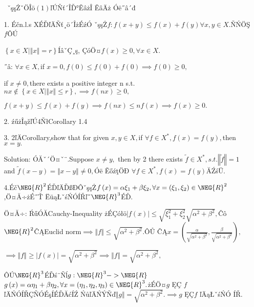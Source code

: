 \documentclass{article}
\begin{document}
\begin{CJK}{GBK}{song}


\bigskip\ 
ˇşşŻˇÖÎö$\left(
1\right) $ľÚŇť´ÎĎ°ĚâżÎ ĚâÄż%
Óë˝â´đ

1. Éčn.l.s XÉĎľÄŇť¸ö´ÎżÉźÓ%
ˇşşŻ$f:f(x+y)\leq f\left( x\right) +f\left( y\right) \forall
x,y\in X.$ŇŃÖŞ$f$ÔÚ

$\left\{ x\in X|\left\Vert x\right\Vert =r\right\} $ÍâˇÇ¸ş,%
ÇóÖ¤$f\left( x\right) \geq 0,\forall x\in X.$

˝â: $\forall x\in X,$if $x=0,f\left( 0\right) \leq f\left( 0\right)
+f\left( 0\right) \implies f\left( 0\right) \geq 0,$

if $x\neq 0,$there exists a positive integer n s.t. $nx\notin \left\{ x\in
X|\left\Vert x\right\Vert \leq r\right\} ,\implies f\left( nx\right) \geq 0,$

$f(x+y)\leq f\left( x\right) +f\left( y\right) \implies f\left( nx\right)
\leq nf\left( x\right) \implies f\left( x\right) \geq 0.$

2. źűżÎąžľÚ4ŇłCorollary 1.4

3. 2ľÄCorollary,show that for given $x,y\in X,$if $\forall f\in
X^{\ast },f\left( x\right) =f\left( y\right) ,$then $x=y.$

Solution: ÓĂˇ´Ö¤ˇ¨.Suppose $x\neq y,$ then by 2
there exists $\tilde{f}\in X^{\ast },s.t.\left\Vert \tilde{f}\right\Vert =1$
and $\tilde{f}\left( x-y\right) =\left\Vert x-y\right\Vert \neq 0,$Óë%
ĚőźţÖĐ $\forall f\in X^{\ast },f\left( x\right) =f\left(
y\right) $ĂŹśÜ.

4.Éč$\NEG{R}^{2}$ÉĎľÄĎßĐÔˇşşŻ$%
f\left( x\right) =\alpha \xi _{1}+\beta \xi _{2},\forall x=\left( \xi
_{1},\xi _{2}\right) \in \NEG{R}^{2}$,Ö¤Ă÷żÉ˝Ť%
ËüąŁˇśŃÓÍŘľ˝$\NEG{R}^{3}$ÉĎ.

Ö¤Ă÷: ŔűÓĂCauchy-Inequality żÉÇółö$%
\left\vert f\left( x\right) \right\vert \leq \sqrt{\xi _{1}^{2}+\xi _{2}^{2}}%
\sqrt{\alpha ^{2}+\beta ^{2}},$Čô$\NEG{R}^{2}$ČĄEuclid norm$%
\implies \left\Vert f\right\Vert \leq \sqrt{\alpha ^{2}+\beta ^{2}}.$ÔŮ%
ČĄ$x=\left( \frac{\alpha }{\sqrt{\alpha ^{2}+\beta ^{2}}},\frac{\beta 
}{\sqrt{\alpha ^{2}+\beta ^{2}}}\right) ,$

$\implies \left\Vert f\right\Vert \geq \left\vert f\left( x\right)
\right\vert =\sqrt{\alpha ^{2}+\beta ^{2}}\implies \left\Vert f\right\Vert =%
\sqrt{\alpha ^{2}+\beta ^{2}},$

ÔÚ$\NEG{R}^{3}$ÉĎś¨Ňĺ$g:\NEG{R}^{3}->\NEG{R}$ $%
g\left( x\right) =\alpha \eta _{1}+\beta \eta _{2},\forall x=\left( \eta
_{1},\eta _{2},\eta _{3}\right) \in \NEG{R}^{3}.$żÉÖ¤$g$ ĘÇ%
$f$ľÄŃÓÍŘÇŇÓÉşÍÉĎĂćÍŹ%
ŃůľÄŃÝŇď$\left\Vert g\right\Vert =\sqrt{\alpha
^{2}+\beta ^{2}}.\implies g$ ĘÇ$f$ ľÄąŁˇśŃÓ%
ÍŘ.


\end{CJK}
\end{document}
